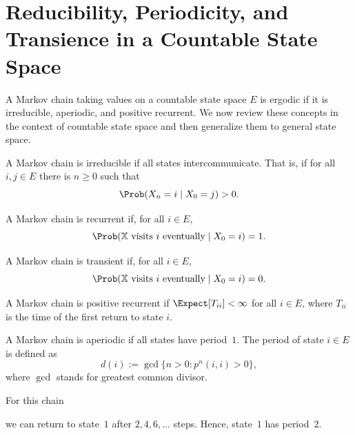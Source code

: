\section{Reducibility, Periodicity, and Transience in a Countable State Space}
\label{sec:A.3}

A Markov chain taking values on a countable state space $E$ is ergodic if it is irreducible,
aperiodic, and positive recurrent.  We now review these concepts in the context of countable state
space and then generalize them to general state space.

\begin{definition}
\label{def:A.13}
A Markov chain is irreducible if all states intercommunicate.  That is, if for all $i, j \in E$
there is $n \geq 0$ such that
\[
  \Prob(X_n = i \mid X_0 = j) > 0.
\]
\end{definition}

\begin{definition}
\label{def:A.14}
A Markov chain is recurrent if, for all $i \in E$,
\[
  \Prob(\mathbb{X} \text{ visits } i \text{ eventually} \mid X_0 = i) = 1.
\]
\end{definition}

\begin{definition}
\label{def:A.15}
A Markov chain is transient if, for all $i \in E$,
\[
  \Prob(\mathbb{X} \text{ visits } i \text{ eventually} \mid X_0 = i) = 0.
\]
\end{definition}

\begin{definition}
\label{def:A.16}
A Markov chain is positive recurrent if $\Expect[T_{ii}] < \infty$ for all $i \in E$, where
$T_{ii}$ is the time of the first return to state $i$.
\end{definition}

\begin{definition}
\label{def:A.17}
A Markov chain is aperiodic if all states have period~$1$.  The period of state $i \in E$ is
defined as
\[
  d(i) := \gcd\{n > 0 : p^n(i, i) > 0\},
\]
where $\gcd$ stands for greatest common divisor.
\end{definition}

\begin{example}[Periodicity]
\label{ex:A.18}
For this chain
\begin{center}
\end{center}
we can return to state~$1$ after $2, 4, 6, \ldots$ steps.  Hence, state~$1$ has period~$2$.
\end{example}

